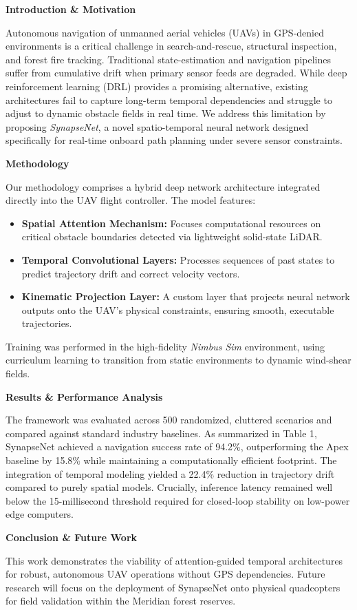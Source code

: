 \documentclass[10pt]{article}
\newcommand{\abstractsection}[1]{\vspace{0.12cm}\noindent\textbf{\color{primary}\fontsize{9}{11}\selectfont #1}\par\vspace{0.03cm}}
\begin{document}
\vspace{0.2cm}
\noindent{\color{secondary}\rule{\textwidth}{1.2pt}}
\vspace{0.2cm}

\noindent
\begin{minipage}[t]{0.63\textwidth}
    \fontsize{8.5}{11}\selectfont
    \abstractsection{Introduction \& Motivation}
    Autonomous navigation of unmanned aerial vehicles (UAVs) in GPS-denied environments is a critical challenge in search-and-rescue, structural inspection, and forest fire tracking. Traditional state-estimation and navigation pipelines suffer from cumulative drift when primary sensor feeds are degraded. While deep reinforcement learning (DRL) provides a promising alternative, existing architectures fail to capture long-term temporal dependencies and struggle to adjust to dynamic obstacle fields in real time. We address this limitation by proposing \textit{SynapseNet}, a novel spatio-temporal neural network designed specifically for real-time onboard path planning under severe sensor constraints.

    \abstractsection{Methodology}
    Our methodology comprises a hybrid deep network architecture integrated directly into the UAV flight controller. The model features:
    \begin{itemize}[leftmargin=*,noitemsep,topsep=1.5pt,parsep=0.5pt]
        \item \textbf{Spatial Attention Mechanism:} Focuses computational resources on critical obstacle boundaries detected via lightweight solid-state LiDAR.
        \item \textbf{Temporal Convolutional Layers:} Processes sequences of past states to predict trajectory drift and correct velocity vectors.
        \item \textbf{Kinematic Projection Layer:} A custom layer that projects neural network outputs onto the UAV's physical constraints, ensuring smooth, executable trajectories.
    \end{itemize}
    Training was performed in the high-fidelity \textit{Nimbus Sim} environment, using curriculum learning to transition from static environments to dynamic wind-shear fields.

    \abstractsection{Results \& Performance Analysis}
    The framework was evaluated across 500 randomized, cluttered scenarios and compared against standard industry baselines. As summarized in Table 1, SynapseNet achieved a navigation success rate of 94.2\%, outperforming the Apex baseline by 15.8\% while maintaining a computationally efficient footprint. The integration of temporal modeling yielded a 22.4\% reduction in trajectory drift compared to purely spatial models. Crucially, inference latency remained well below the 15-millisecond threshold required for closed-loop stability on low-power edge computers.

    \abstractsection{Conclusion \& Future Work}
    This work demonstrates the viability of attention-guided temporal architectures for robust, autonomous UAV operations without GPS dependencies. Future research will focus on the deployment of SynapseNet onto physical quadcopters for field validation within the Meridian forest reserves.
\end{minipage}
\end{document}
